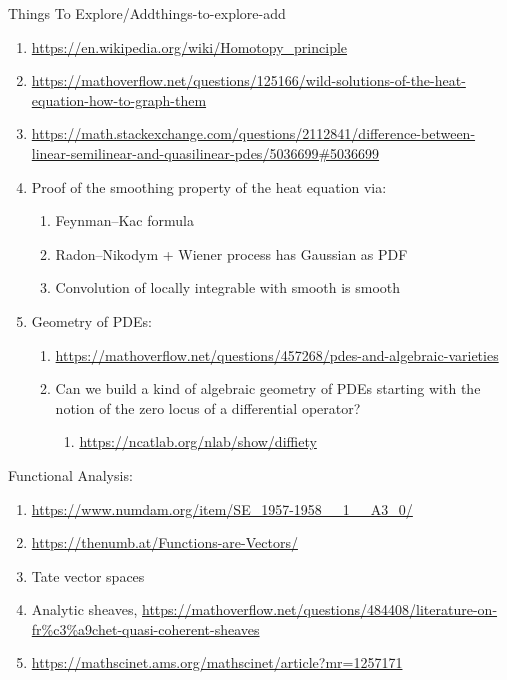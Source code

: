 \begin{remark}{Things To Explore/Add}{things-to-explore-add}
\begin{enumerate}
\begin{enumerate}
            \end{enumerate}
        \item \url{https://en.wikipedia.org/wiki/Homotopy_principle}
        \item \url{https://mathoverflow.net/questions/125166/wild-solutions-of-the-heat-equation-how-to-graph-them}
        \item \url{https://math.stackexchange.com/questions/2112841/difference-between-linear-semilinear-and-quasilinear-pdes/5036699\#5036699}
        \item Proof of the smoothing property of the heat equation via:
            \begin{enumerate}
                \item Feynman--Kac formula
                \item Radon--Nikodym + Wiener process has Gaussian as PDF
                \item Convolution of locally integrable with smooth is smooth
            \end{enumerate}
        \item Geometry of PDEs:
            \begin{enumerate}
                \item \url{https://mathoverflow.net/questions/457268/pdes-and-algebraic-varieties}
                \item Can we build a kind of algebraic geometry of PDEs starting with the notion of the zero locus of a differential operator?
                    \begin{enumerate}
                        \item \url{https://ncatlab.org/nlab/show/diffiety}
                    \end{enumerate}
            \end{enumerate}
    \end{enumerate}
    Functional Analysis:
    \begin{enumerate}
        \item \url{https://www.numdam.org/item/SE_1957-1958__1__A3_0/}
        \item \url{https://thenumb.at/Functions-are-Vectors/}
        \item Tate vector spaces
        \item Analytic sheaves, \url{https://mathoverflow.net/questions/484408/literature-on-fr\%c3\%a9chet-quasi-coherent-sheaves}
        \item \url{https://mathscinet.ams.org/mathscinet/article?mr=1257171}

\end{enumerate}
\end{remark}
